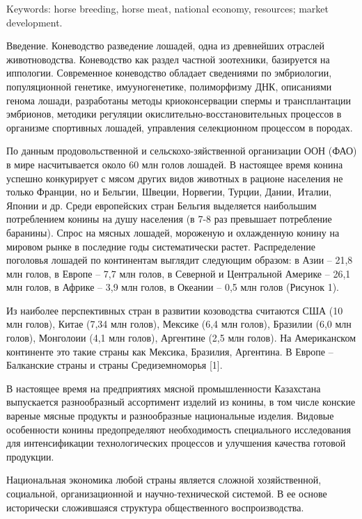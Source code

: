 Keywords: horse breeding, horse meat, national economy, resources;
market development.
\begin{multicols}{2}

Введение. Коневодство разведение лошадей, одна из древнейших отраслей
животноводства. Коневодство как раздел частной зоотехники, базируется на
иппологии. Современное коневодство обладает сведениями по эмбриологии,
популяционной генетике, имууногенетике, полиморфизму ДНК, описаниями
генома лошади, разработаны методы криоконсервации спермы и
трансплантации эмбрионов, методики регуляции
окислительно-восстановительных процессов в организме спортивных лошадей,
управления селекционном процессом в породах.

По данным продовольственной и сельскохо-зяйственной организации ООН (ФАО)
в мире насчитывается около 60 млн голов лошадей. В настоящее время
конина успешно конкурирует с мясом других видов животных в рационе
населения не только Франции, но и Бельгии, Швеции, Норвегии, Турции,
Дании, Италии, Японии и др. Среди европейских стран Бельгия выделяется
наибольшим потреблением конины на душу населения (в 7-8 раз превышает
потребление баранины). Спрос на мясных лошадей, мороженую и охлажденную
конину на мировом рынке в последние годы систематически растет.
Распределение поголовья лошадей по континентам выглядит следующим
образом: в Азии -- 21,8 млн голов, в Европе -- 7,7 млн голов, в Северной
и Центральной Америке -- 26,1 млн голов, в Африке -- 3,9 млн голов, в
Океании -- 0,5 млн голов (Рисунок 1).


Из наиболее перспективных стран в развитии козоводства считаются США (10
млн голов), Китае (7,34 млн голов), Мексике (6,4 млн голов), Бразилии
(6,0 млн голов), Монголоии (4,1 млн голов), Аргентине (2,5 млн голов).
На Американском континенте это такие страны как Мексика, Бразилия,
Аргентина. В Европе -- Балканские страны и страны Средиземноморья
{[}1{]}.



В настоящее время на предприятиях мясной промышленности Казахстана
выпускается разнообразный ассортимент изделий из конины, в том числе
конские вареные мясные продукты и разнообразные национальные изделия.
Видовые особенности конины предопределяют необходимость специального
исследования для интенсификации технологических процессов и улучшения
качества готовой продукции.


Национальная экономика любой страны является сложной хозяйственной,
социальной, организационной и научно-технической системой. В ее основе
исторически сложившаяся структура общественного воспроизводства.

\end{multicols}

